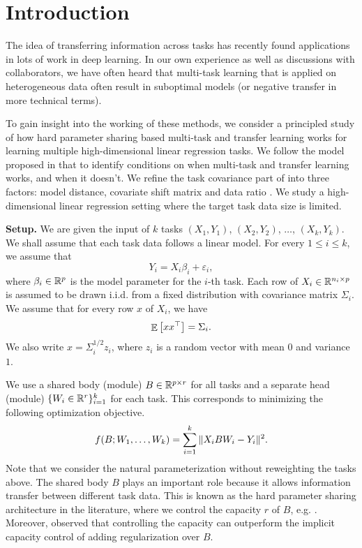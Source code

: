 \section{Introduction}

The idea of transferring information across tasks has recently found applications in lots of work in deep learning.
In our own experience as well as discussions with collaborators, we have often heard that multi-task learning that is applied on heterogeneous data often result in suboptimal models (or negative transfer in more technical terms).

To gain insight into the working of these methods, we consider a principled study of how hard parameter sharing based multi-task and transfer learning works for learning multiple high-dimensional linear regression tasks.
We follow the model proposed in \cite{WZR20} that to identify conditions on when multi-task and transfer learning works, and when it doesn't.
We refine the task covariance part of \cite{WZR20} into three factors: model distance, covariate shift matrix and data ratio \cite{PY09,K18}.
We study a high-dimensional linear regression setting where the target task data size is limited.

\smallskip
\noindent\textbf{Setup.} We are given the input of $k$ tasks $(X_1, Y_1)$, $(X_2, Y_2)$, $\dots$, $(X_k, Y_k)$.
We shall assume that each task data follows a linear model.
For every $1\le i\le k$, we assume that
\[ Y_i = X_i \beta_i + \varepsilon_i, \]
where $\beta_i\in\mathbb{R}^p$ is the model parameter for the $i$-th task.
Each row of $X_i\in\mathbb{R}^{n_i\times p}$ is assumed to be drawn i.i.d. from a fixed distribution with covariance matrix $\Sigma_i$.
We assume that for every row $x$ of $X_i$, we have
\[ \mathop{\mathbb{E}}\left[ xx^{\top} \right] = \Sigma_i. \]
We also write $x = \Sigma_i^{1/2} z_i$, where $z_i$ is a random vector with mean $0$ and variance $1$.

We use a shared body (module) $B\in\mathbb{R}^{p\times r}$ for all tasks and a separate head (module) $\{W_i \in \mathbb{R}^{r}\}_{i=1}^k$ for each task.
This corresponds to minimizing the following optimization objective.
\begin{align}
	\label{eq_mtl}
	f(B; W_1, \dots, W_k) = \sum_{i=1}^k \|X_i B W_i - Y_i\|^2.
\end{align}
Note that we consider the natural parameterization without reweighting the tasks above.
The shared body $B$ plays an important role because it allows information transfer between different task data.
This is known as the hard parameter sharing architecture in the literature, where we control the capacity $r$ of $B$, e.g. \cite{KD12,WZR20}.
Moreover, \cite{KD12} observed that controlling the capacity can outperform the implicit capacity control of adding regularization over $B$.


